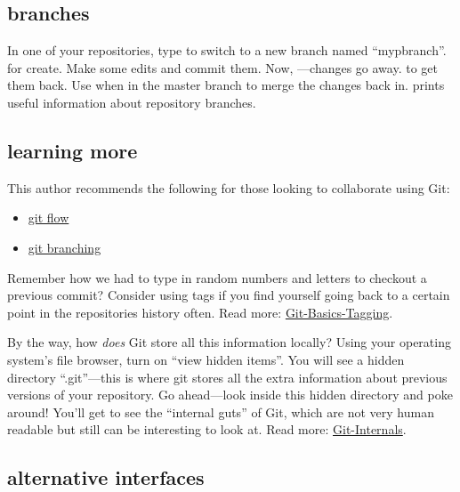 \documentclass{training}
\begin{document}
\subsection{branches}

In one of your repositories, type  to switch to a new branch named ``mypbranch''.
 for create.
Make some edits and commit them.
Now, ---changes go away.
 to get them back.
Use  when in the master branch to merge the changes back in.
 prints useful information about repository branches.

\subsection{learning more}

This author recommends the following for those looking to collaborate using Git:
\begin{itemize}
  \item \href{https://nvie.com/posts/a-successful-git-branching-model/}{git flow}
  \item \href{https://git-scm.com/book/en/v2/Git-Branching-Branches-in-a-Nutshell}{git branching}
\end{itemize}

Remember how we had to type in random numbers and letters to checkout a previous commit?
Consider using tags if you find yourself going back to a certain point in the repositories history often.
Read more: \href{https://git-scm.com/book/en/v2/Git-Basics-Tagging}{Git-Basics-Tagging}.

By the way, how \emph{does} Git store all this information locally?
Using your operating system's file browser, turn on ``view hidden items''.
You will see a hidden directory ``.git''---this is where git stores all the extra information about previous versions of your repository.
Go ahead---look inside this hidden directory and poke around!
You'll get to see the ``internal guts'' of Git, which are not very human readable but still can be interesting to look at.
Read more: \href{https://git-scm.com/book/en/v2/Git-Internals-Plumbing-and-Porcelain}{Git-Internals}.

\subsection{alternative interfaces}
\end{document}
